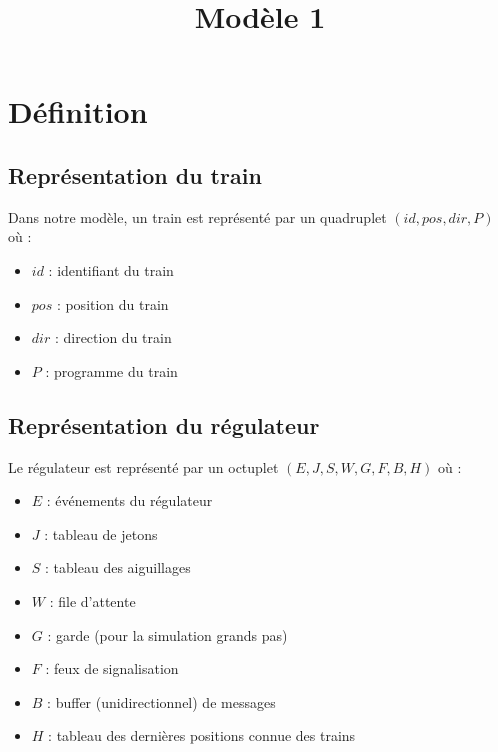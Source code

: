 \documentclass[12pt]{article}
\title{Modèle 1}
\author{}
\begin{document}
\newcommand\concat[2]{#1;#2}
\newcommand\train[4]{(#1, #2, #3, #4)} %
\newcommand\trainfull[4]{\Gamma \cup \train{#1}{#2}{#3}{#4}} 
\newcommand\reg[8]{(#1, #2, #3, #4, #5, #6, #7, #8)} %

\newcommand\maj[2]{#1 \gets #2} %
\newcommand\majtab[3]{#1[#2] \gets #3}
\newcommand\supprdict[2]{#1' \gets suppr(#1, #2)} %
\newcommand\bracket[2]{
    \begin{math}
        \biggl\{
        \begin{array}{l}
            #1\\
            #2
        \end{array}
    \end{math}
}



\maketitle


\section{Définition}

\subsection{Représentation du train}
Dans notre modèle, un train est représenté par un quadruplet $(id, pos, dir, P)$ où :
\begin{itemize}
    \item $id$ : identifiant du train
    \item $pos$ : position du train 
    \item $dir$ : direction du train
    \item $P$ : programme du train
\end{itemize}

\subsection{Représentation du régulateur}
Le régulateur est représenté par un octuplet $(E, J, S, W, G, F, B, H)$ où :
\begin{itemize}
    \item $E$ : événements du régulateur
    \item $J$ : tableau de jetons
    \item $S$ : tableau des aiguillages
    \item $W$ : file d'attente
    \item $G$ : garde (pour la simulation grands pas)
    \item $F$ : feux de signalisation
    \item $B$ : buffer (unidirectionnel) de messages
    \item $H$ : tableau des dernières positions connue des trains
\end{itemize}
\end{document}
